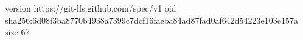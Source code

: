 version https://git-lfs.github.com/spec/v1
oid sha256:6d08f3ba8770b4938a7399c7dcf16faeba84ad87fad0af642d54223e103e157a
size 67
